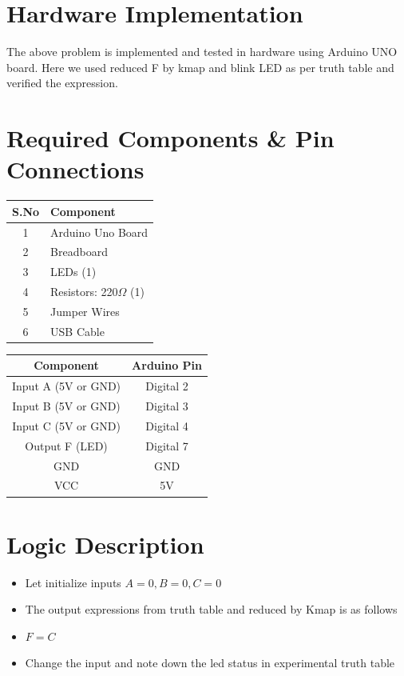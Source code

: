 \documentclass[a4paper,12pt]{article}
\begin{document}
\section*{\textbf{Hardware Implementation}}
The above problem is implemented and tested in hardware using Arduino UNO board. Here we used reduced F by kmap and blink LED as per truth table and verified the expression.
\section*{Required Components \& Pin Connections}
\begin{center}
\begin{minipage}{0.45\textwidth}
\begin{table}[H]
\centering
\begin{tabular}{|c|l|}
\hline
\textbf{S.No} & \textbf{Component} \\ \hline
1 & Arduino Uno Board \\
2 & Breadboard \\
3 & LEDs (1) \\
4 & Resistors: 220$\Omega$ (1) \\
5 & Jumper Wires \\
6 & USB Cable \\
\hline
\end{tabular}
\end{table}
\end{minipage}
\hspace{0.05\textwidth}
\begin{minipage}{0.45\textwidth}
\begin{table}[H]
\centering
\begin{tabular}{|c|c|}
\hline
\textbf{Component} & \textbf{Arduino Pin} \\ \hline
Input A (5V or GND) & Digital 2 \\
Input B (5V or GND) & Digital 3 \\
Input C (5V or GND) & Digital 4 \\
Output F (LED) & Digital 7 \\
GND & GND \\
VCC & 5V \\
\hline
\end{tabular}
\end{table}
\end{minipage}
\end{center}
\section*{Logic Description}
\begin{itemize}
	\item Let initialize inputs $A=0,B=0,C=0$
	\item The output expressions from truth table and reduced by Kmap is as follows
	\item $F=C$
	\item Change the input and note down the led status in experimental truth table
\end{itemize}
\end{document}
